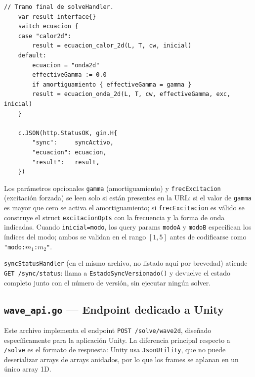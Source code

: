 \documentclass[12pt, a4paper]{article}
\begin{document}
\begin{lstlisting}[style=golang, caption={Selección del solver y construcción de la respuesta}]
// Tramo final de solveHandler.
    var result interface{}
    switch ecuacion {
    case "calor2d":
        result = ecuacion_calor_2d(L, T, cw, inicial)
    default:
        ecuacion = "onda2d"
        effectiveGamma := 0.0
        if amortiguamiento { effectiveGamma = gamma }
        result = ecuacion_onda_2d(L, T, cw, effectiveGamma, exc, inicial)
    }

    c.JSON(http.StatusOK, gin.H{
        "sync":     syncActivo,
        "ecuacion": ecuacion,
        "result":   result,
    })
\end{lstlisting}

Los parámetros opcionales \texttt{gamma} (amortiguamiento) y
\texttt{frecExcitacion} (excitación forzada) se leen solo si están presentes en la
URL: si el valor de \texttt{gamma} es mayor que cero se activa el amortiguamiento; si
\texttt{frecExcitacion} es válido se construye el struct \texttt{excitacionOpts} con la
frecuencia y la forma de onda indicadas. Cuando \texttt{inicial=modo}, los query params
\texttt{modoA} y \texttt{modoB} especifican los índices del modo; ambos se validan en
el rango $[1,5]$ antes de codificarse como \texttt{"modo:$m_1$:$m_2$"}.

\texttt{syncStatusHandler} (en el mismo archivo, no listado aquí por brevedad) atiende
\texttt{GET /sync/status}: llama a \texttt{EstadoSyncVersionado()} y devuelve el estado
completo junto con el número de versión, sin ejecutar ningún solver.

\subsection{\texttt{wave\_api.go} — Endpoint dedicado a Unity}

Este archivo implementa el endpoint \texttt{POST /solve/wave2d}, diseñado
específicamente para la aplicación Unity. La diferencia principal respecto a
\texttt{/solve} es el formato de respuesta: Unity usa \texttt{JsonUtility}, que no
puede deserializar arrays de arrays anidados, por lo que los frames se aplanan en un
único array 1D.
\end{document}

